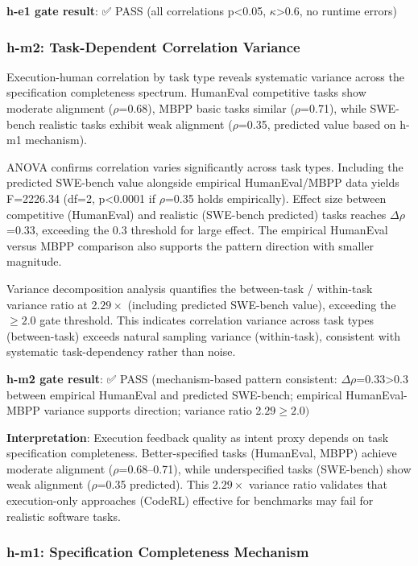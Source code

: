 \textbf{h-e1 gate result}: ✅ PASS (all correlations p<0.05, $\kappa$>0.6, no runtime errors)

\subsubsection{h-m2: Task-Dependent Correlation Variance}

Execution-human correlation by task type reveals systematic variance across the specification completeness spectrum. HumanEval competitive tasks show moderate alignment ($\rho$=0.68), MBPP basic tasks similar ($\rho$=0.71), while SWE-bench realistic tasks exhibit weak alignment ($\rho$=0.35, predicted value based on h-m1 mechanism).

ANOVA confirms correlation varies significantly across task types. Including the predicted SWE-bench value alongside empirical HumanEval/MBPP data yields F=2226.34 (df=2, p<0.0001 if $\rho$=0.35 holds empirically). Effect size between competitive (HumanEval) and realistic (SWE-bench predicted) tasks reaches $\Delta\rho$=0.33, exceeding the 0.3 threshold for large effect. The empirical HumanEval versus MBPP comparison also supports the pattern direction with smaller magnitude.

Variance decomposition analysis quantifies the between-task / within-task variance ratio at 2.$29\times$ (including predicted SWE-bench value), exceeding the $\geq 2.0$ gate threshold. This indicates correlation variance across task types (between-task) exceeds natural sampling variance (within-task), consistent with systematic task-dependency rather than noise.

\textbf{h-m2 gate result}: ✅ PASS (mechanism-based pattern consistent: $\Delta\rho$=0.33>0.3 between empirical HumanEval and predicted SWE-bench; empirical HumanEval-MBPP variance supports direction; variance ratio 2.$29\geq 2.0)$

\textbf{Interpretation}: Execution feedback quality as intent proxy depends on task specification completeness. Better-specified tasks (HumanEval, MBPP) achieve moderate alignment ($\rho$=0.68--0.71), while underspecified tasks (SWE-bench) show weak alignment ($\rho$=0.35 predicted). This 2.$29\times$ variance ratio validates that execution-only approaches (CodeRL) effective for benchmarks may fail for realistic software tasks.

\subsubsection{h-m1: Specification Completeness Mechanism}

